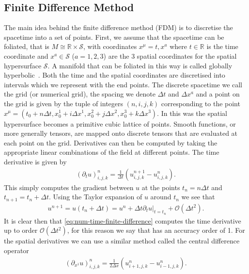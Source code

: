 \documentclass[10pt]{report}
\theoremstyle{definition}
\newcommand{\R}[0]{\mathbb{R}}
\newcommand{\spasurf}[0]{\mathcal{S}}
\begin{document}
\subsection{Finite Difference Method}
The main idea behind the finite difference method (FDM) is to discretise the spacetime into a set of points. First, we assume that the spacetime can be foliated, that is $M \cong \R \times \spasurf$, with coordinates $x^\mu = t,x^a$ where $t \in \R$ is the time coordinate and $x^a \in \spasurf$ ($a = 1,2,3$) are the 3 spatial coordinates for the spatial hypersurface $\spasurf$. A manifold that can be foliated in this way is called globally hyperbolic~\cite{Leray1953}. Both the time and the spatial coordinates are discretised into intervals which we represent with the end points. The discrete spacetime we call the grid (or numerical grid), the spacing we denote $\Delta t$ and $\Delta x^a$ and a point on the grid is given by the tuple of integers $(n,i,j,k)$ corresponding to the point $x^\mu = (t_0 + n \Delta t,x^1_0 + i \Delta x^1,x^2_0 + j \Delta x^2,x^3_0 + k \Delta x^3)$. In this was the spatial hypersurface becomes a primitive cubic lattice of points. Smooth functions, or more generally tensors, are mapped onto discrete tensors that are evaluated at each point on the grid. Derivatives can then be computed by taking the appropriate linear combinations of the field at different points. The time derivative is given by
\begin{align}
    (\partial_t u)^n_{i,j,k} = \frac{1}{\Delta t}(u^{n+1}_{i,j,k} - u^n_{i,j,k}). \label{eq:num-time-finite-difference}
\end{align}
This simply computes the gradient between $u$ at the points $t_n = n \Delta t$ and $t_{n+1} = t_n + \Delta t$. Using the Taylor expansion of $u$  around $t_n$ we see that
\begin{align}
    u^{n+1} = u(t_n + \Delta t) = u^n + \Delta t \partial_t u |_{t = t_n} + \mathcal{O}(\Delta t^2).
\end{align}
It is clear then that \cref{eq:num-time-finite-difference} computes the time derivative up to order $\mathcal{O}(\Delta t^2)$, for this reason we say that has an accuracy order of 1. For the spatial derivatives we can use a similar method called the central difference operator 
\begin{align}
    (\partial_{x^1} u)^n_{i,j,k} = \frac{1}{2 \Delta x} \left( u^n_{i+1,j,k} - u^n_{i-1,j,k} \right) \label{eq:num-space-finit-difference}.
\end{align}
\end{document}

